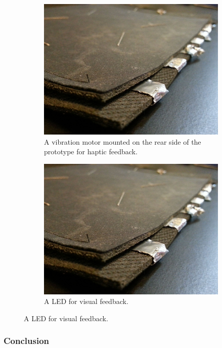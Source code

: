 \begin{figure}[t]
\centering
\begin{subfigure}[t]{.45\textwidth}
  \centering
  \includegraphics[width=.9\linewidth]{figures/touch/feedback_haptic}
  \caption{A vibration motor mounted on the rear side of the prototype for haptic feedback.}
  \label{fig:ch:textiletouch:feedback:haptic}
\end{subfigure}%
\hspace{0.5cm}
\begin{subfigure}[t]{.45\textwidth}
  \centering
  \includegraphics[width=.9\linewidth]{figures/touch/feedback_haptic}
  \caption{A LED for visual feedback.}
  \label{fig:ch:textiletouch:feedback:visual}
\end{subfigure}
\end{figure}

\subsubsection{Conclusion} 

